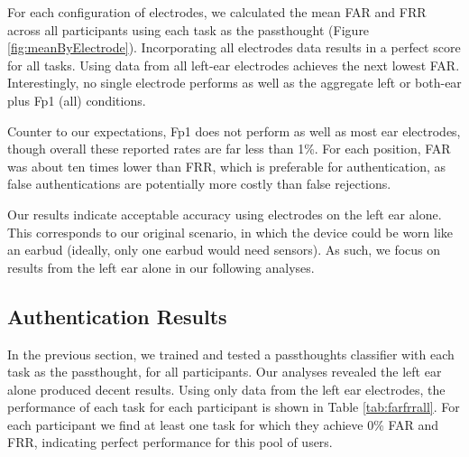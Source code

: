 \documentclass{sigchi}
\begin{document}
For each configuration of electrodes, we calculated the mean FAR and FRR across all participants using each task as the passthought (Figure \ref{fig:meanByElectrode}).
Incorporating all electrodes data results in a perfect score for all tasks.
Using data from all left-ear electrodes achieves the next lowest FAR.
Interestingly, no single electrode performs as well as the aggregate left or both-ear plus Fp1 (all) conditions. 

Counter to our expectations, Fp1 does not perform as well as most ear electrodes, though overall these reported rates are far less than 1\%. 
For each position, FAR was about ten times lower than FRR, which is preferable for authentication, as false authentications are potentially more costly than false rejections.

Our results indicate acceptable accuracy using electrodes on the left ear alone. 
This corresponds to our original scenario, in which the device could be worn like an earbud (ideally, only one earbud would need sensors). As such, we focus on results from the left ear alone in our following analyses.

\subsection{Authentication Results}

In the previous section, we trained and tested a passthoughts classifier with each task as the passthought, for all participants. Our analyses revealed the left ear alone produced decent results. Using only data from the left ear electrodes, the performance of each task for each participant is shown in Table \ref{tab:farfrrall}. For each participant we find at least one task for which they achieve 0\% FAR and FRR, indicating perfect performance for this pool of users.
\end{document}
